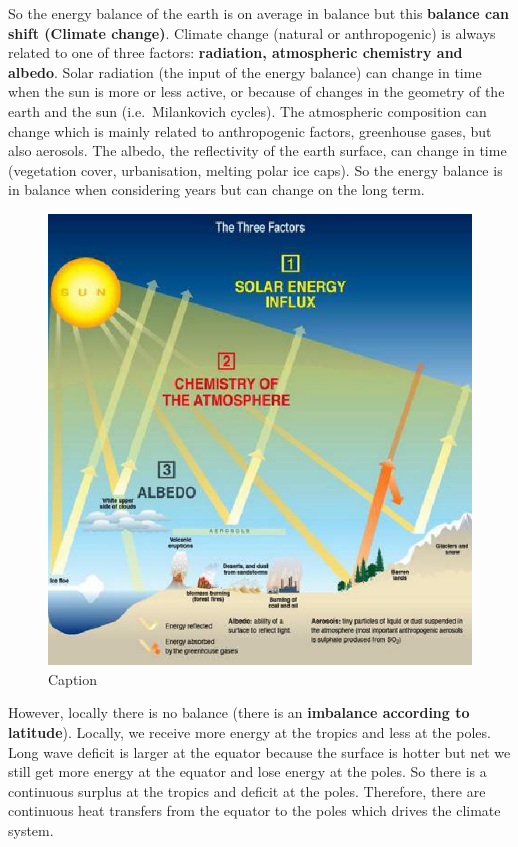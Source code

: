\documentclass[oneside]{book}
\begin{document}
So the energy balance of the earth is on average in balance but this
\textbf{balance can shift (Climate change)}. Climate change (natural or
anthropogenic) is always related to one of three factors:
\textbf{radiation, atmospheric chemistry and albedo}. Solar radiation
(the input of the energy balance) can change in time when the sun is
more or less active, or because of changes in the geometry of the earth
and the sun (i.e.~Milankovich cycles). The atmospheric composition can
change which is mainly related to anthropogenic factors, greenhouse
gases, but also aerosols. The albedo, the reflectivity of the earth
surface, can change in time (vegetation cover, urbanisation, melting
polar ice caps). So the energy balance is in balance when considering
years but can change on the long term.

\begin{figure}

{\centering \includegraphics[width=0.6\linewidth]{figures/Figure142} 

}

\caption{Caption}\label{fig:EnergyBudget4}
\end{figure}

However, locally there is no balance (there is an \textbf{imbalance
according to latitude}). Locally, we receive more energy at the tropics
and less at the poles. Long wave deficit is larger at the equator
because the surface is hotter but net we still get more energy at the
equator and lose energy at the poles. So there is a continuous surplus
at the tropics and deficit at the poles. Therefore, there are continuous
heat transfers from the equator to the poles which drives the climate
system.
\end{document}

